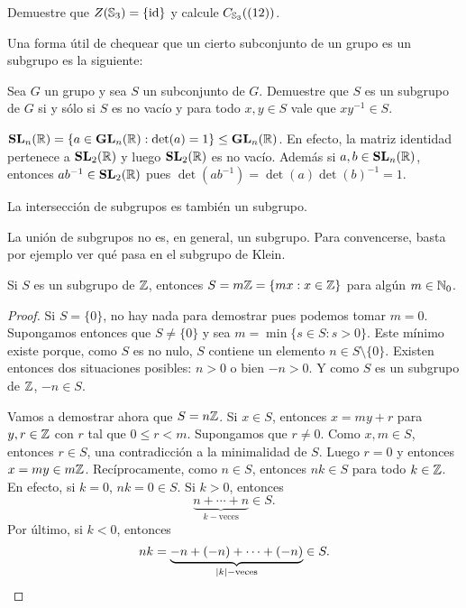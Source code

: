 \begin{exercise}
Demuestre que $Z(\mathbb{S}_3)=\{\operatorname{id}\}$ y calcule $C_{\mathbb{S}_3}((12))$. 
\end{exercise}

Una forma útil de chequear que un cierto subconjunto de un grupo 
es un subgrupo es la siguiente:

\begin{exercise}
	Sea $G$ un grupo y sea $S$ un subconjunto de $G$. Demuestre que $S$ es un subgrupo
	de $G$ si y sólo si $S$ es no vacío y para todo $x,y\in S$ vale que $xy^{-1}\in S$. 
\end{exercise}

\begin{example}
$\mathbf{SL}_n(\mathbb{R})=\{a\in\mathbf{GL}_n(\mathbb{R}):\det(a)=1\}\leq\mathbf{GL}_n(\mathbb{R})$. En efecto, la matriz identidad pertenece a $\mathbf{SL}_2(\mathbb{R})$ y luego $\mathbf{SL}_2(\mathbb{R})$ es no vacío. Además si $a,b\in\mathbf{SL}_n(\mathbb{R})$, 
entonces $ab^{-1}\in\mathbf{SL}_2(\mathbb{R})$ pues $\det(ab^{-1})=\det(a)\det(b)^{-1}=1	$. 
\end{example}

\begin{exercise}
	La intersección de subgrupos es también un subgrupo.
\end{exercise}

La unión de subgrupos no es, en general, un subgrupo. Para convencerse, basta por ejemplo ver qué pasa 
en el subgrupo de Klein. 


\begin{theorem}
\label{thm:Z}
	Si $S$ es un subgrupo de $\mathbb{Z}$, entonces 
	$S=m\mathbb{Z}=\{mx:x\in \mathbb{Z}\}$
	para algún $m\in\mathbb{N}_0$.  
\end{theorem}
	
\begin{proof}
	Si $S=\{0\}$, no hay nada para demostrar pues podemos
	tomar $m=0$. Supongamos entonces que $S\ne\{0\}$ y sea $m=\min\{s\in S:s>0\}$. Este mínimo existe porque, como $S$ es no nulo, $S$ contiene un elemento $n\in S\setminus\{0\}$. Existen entonces dos situaciones posibles: $n>0$ o bien $-n>0$. Y como $S$ es un subgrupo de $\mathbb{Z}$, $-n\in S$.
	 
	Vamos a demostrar ahora que $S=n\mathbb{Z}$. 
	Si $x\in S$, entonces $x=my+r$ para $y,r\in\mathbb{Z}$ con $r$ tal que
	$0\leq r<m$. Supongamos que $r\ne 0$. Como $x,m\in S$, entonces $r\in S$,
	una contradicción a la minimalidad de $S$.  Luego $r=0$ y entonces $x=my\in
	m\mathbb{Z}$. Recíprocamente, como $n\in S$, entonces $nk\in S$ para todo $k\in\mathbb{Z}$. En efecto, si $k=0$, $nk=0\in S$. Si $k>0$, entonces 
	\[
	\underbrace{n+\cdots+n}_{k-\text{veces}}\in S.
	\]
	Por último, si $k<0$, entonces 
	\[
	nk=\underbrace{-n+(-n)+\cdots+(-n)}_{|k|-\text{veces}}\in S.\qedhere
	\]		
\end{proof}

